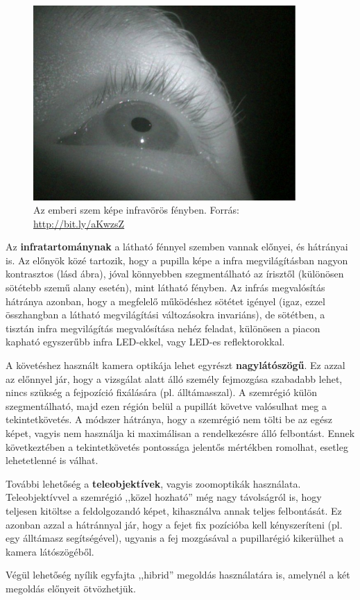 \begin{figure}[!ht]
\centering
\includegraphics[width=100mm, keepaspectratio]{figures/infra_eye.png}
\caption{Az emberi szem képe infravörös fényben. Forrás: \url{http://bit.ly/aKwzsZ}}
\label{fig:eyepic}
\end{figure}

Az \textbf{infratartománynak} a látható fénnyel szemben vannak előnyei, és hátrányai is. Az előnyök közé tartozik, hogy a pupilla képe a infra megvilágításban nagyon kontrasztos (lásd  ábra), jóval könnyebben szegmentálható az írisztől (különösen sötétebb szemű alany esetén), mint látható fényben. Az infrás megvalósítás hátránya azonban, hogy a megfelelő működéshez sötétet igényel (igaz, ezzel összhangban a látható megvilágítási változásokra invariáns), de sötétben, a tisztán infra megvilágítás megvalósítása nehéz feladat, különösen a piacon kapható egyszerűbb infra LED-ekkel, vagy LED-es reflektorokkal.

\bigskip

A követéshez használt kamera optikája lehet egyrészt \textbf{nagylátószögű}. Ez azzal az előnnyel jár, hogy a vizsgálat alatt álló személy fejmozgása szabadabb lehet, nincs szükség a fejpozíció fixálására (pl. álltámasszal). A szemrégió külön szegmentálható, majd ezen régión belül a pupillát követve valósulhat meg a tekintetkövetés. A módszer hátránya, hogy a szemrégió nem tölti be az egész képet, vagyis nem használja ki maximálisan a rendelkezésre álló felbontást. Ennek következtében a tekintetkövetés pontossága jelentős mértékben romolhat, esetleg lehetetlenné is válhat.

További lehetőség a \textbf{teleobjektívek}, vagyis zoomoptikák használata. Teleobjektívvel a szemrégió ,,közel hozható'' még nagy távolságról is, hogy teljesen kitöltse a feldolgozandó képet, kihasználva annak teljes felbontását. Ez azonban azzal a hátránnyal jár, hogy a fejet fix pozícióba kell kényszeríteni (pl. egy álltámasz segítségével), ugyanis a fej mozgásával a pupillarégió kikerülhet a kamera látószögéből.

Végül lehetőség nyílik egyfajta ,,hibrid'' megoldás használatára is, amelynél a két megoldás előnyeit ötvözhetjük.